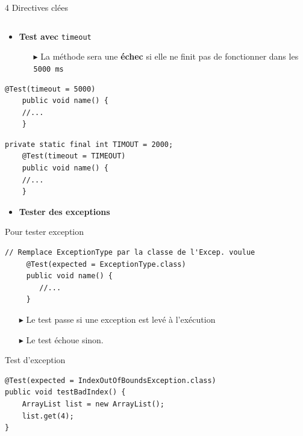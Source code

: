\documentclass[16pt]{report}
\begin{document}
\begin{multicols*}{2}
\begin{EExample}{4 Directives clées}{}
\begin{lstlisting}[style=JavaDraculaWhite]
\end{lstlisting}
\end{EExample}

    \begin{itemize}
        \item \textbf{Test avec} \texttt{timeout}    
            \begin{itemize}
                \item[$\blacktriangleright$] La méthode sera une \textbf{échec} si elle ne finit pas de 
                    fonctionner dans les \texttt{5000 ms}  
            \end{itemize}
    \end{itemize}

\begin{lstlisting}[style=JavaDraculaWhite]
    @Test(timeout = 5000)
    public void name() {
    //...
    }
\end{lstlisting}


\begin{lstlisting}[style=JavaDraculaWhite]
    private static final int TIMOUT = 2000; 
    @Test(timeout = TIMEOUT)
    public void name() {
    //...
    }
\end{lstlisting}


    \begin{itemize}
        \item \textbf{Tester des exceptions}
    \end{itemize}

    \begin{Syntaxe}{Pour tester exception}{}
\begin{lstlisting}[style=JavaDraculaWhite]
    // Remplace ExceptionType par la classe de l'Excep. voulue
     @Test(expected = ExceptionType.class)
     public void name() {
        //...
     }
\end{lstlisting}        
    \end{Syntaxe}

    \begin{itemize}
        \item[$\blacktriangleright$] Le test passe si une exception est levé à l'exécution 
        \item[$\blacktriangleright$] Le test échoue sinon. 
    \end{itemize}

    \begin{EExample}{Test d'exception}{}
\begin{lstlisting}[style=JavaDraculaWhite]
@Test(expected = IndexOutOfBoundsException.class) 
public void testBadIndex() {
    ArrayList list = new ArrayList(); 
    list.get(4);
}
\end{lstlisting}
        

\end{EExample}
\end{multicols*}
\end{document}

